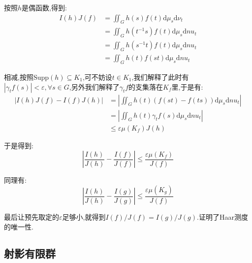 \begin{enumerate}
    按照$h$是偶函数,得到:
    \begin{align*}
    	I(h)J(f)&=\iint_Gh(s)f(t)\mathrm{d}\mu_s\mathrm{d}\nu_t\\&=\iint_Gh(t^{-1}s)f(t)\mathrm{d}\mu_s\mathrm{d}nu_t\\&=\iint_Gh(s^{-1}t)f(t)\mathrm{d}\mu_s\mathrm{d}nu_t\\&=\iint_Gh(t)f(st)\mathrm{d}\mu_s\mathrm{d}nu_t
    \end{align*}
    
    相减,按照$\mathrm{Supp}(h)\subseteq K_1$,可不妨设$t\in K_1$,我们解释了此时有$|\gamma_tf(s)|<\varepsilon,\forall s\in G$,另外我们解释了$\gamma_tf$的支集落在$K_f$里,于是有:
    \begin{align*}
    	\left|I(h)J(f)-I(f)J(h)\right|&=\left|\iint_Gh(t)\left(f(st)-f(ts)\right)\mathrm{d}\mu_s\mathrm{d}nu_t\right|\\&=\left|\iint_Gh(t)\gamma_tf(s)\mathrm{d}\mu_s\mathrm{d}nu_t\right|\\&\le\varepsilon\mu(K_f)J(h)
    \end{align*}
    
    于是得到:
    $$\left|\frac{I(h)}{J(h)}-\frac{I(f)}{J(f)}\right|\le\frac{\varepsilon\mu(K_f)}{J(f)}$$
    
    同理有:
    $$\left|\frac{I(h)}{J(h)}-\frac{I(g)}{J(g)}\right|\le\frac{\varepsilon\mu(K_g)}{J(f)}$$
    
    最后让预先取定的$\varepsilon$足够小,就得到$I(f)/J(f)=I(g)/J(g)$.证明了Haar测度的唯一性.
\end{enumerate}
\newpage
\subsection{射影有限群}

